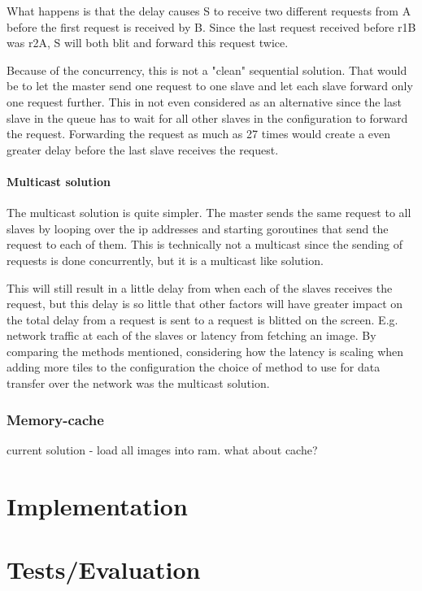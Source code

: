 \documentclass[12pt, a4paper, oneside]{article}
\begin{document}
What happens is that the delay causes S to receive two different requests from A before the first request is received by B. Since the last request received before r1B was r2A, S will both blit and forward this request twice. 

Because of the concurrency, this is not a "clean" sequential solution. That would be to let the master send one request to one slave and let each slave forward only one request further. This in not even considered as an alternative since the last slave in the queue has to wait for all other slaves in the configuration to forward the request. Forwarding the request as much as 27 times would create a even greater delay before the last slave receives the request.

\paragraph{Multicast solution}
The multicast solution is quite simpler. The master sends the same request to all slaves by looping over the ip addresses and starting goroutines that send the request to each of them. This is technically not a multicast since the sending of requests is done concurrently, but it is a multicast like solution.

This will still result in a little delay from when each of the slaves receives the request, but this delay is so little that other factors will have greater impact on the total delay from a request is sent to a request is blitted on the screen. E.g. network traffic at each of the slaves or latency from fetching an image.
\newline
\newline
By comparing the methods mentioned, considering how the latency is scaling when adding more tiles to the configuration the choice of method to use for data transfer over the network was the multicast solution. 

\subsubsection{Memory-cache}
current solution - load all images into ram. what about cache?

\section{Implementation}
\section{Tests/Evaluation}
\end{document}

